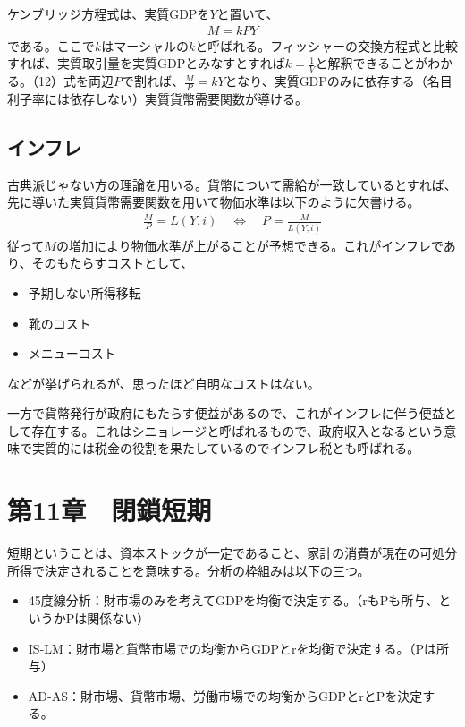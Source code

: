 \documentclass{jsarticle}
\begin{document}
ケンブリッジ方程式は、実質GDPを$Y$と置いて、
\begin{align}
	M = kPY
\end{align}
である。ここで$k$はマーシャルの$k$と呼ばれる。フィッシャーの交換方程式と比較すれば、実質取引量を実質GDPとみなすとすれば$k = \frac{1}{V}$と解釈できることがわかる。（12）式を両辺$P$で割れば、$\frac{M}{P} = kY$となり、実質GDPのみに依存する（名目利子率には依存しない）実質貨幣需要関数が導ける。

\subsection{インフレ}
古典派じゃない方の理論を用いる。貨幣について需給が一致しているとすれば、先に導いた実質貨幣需要関数を用いて物価水準は以下のように欠書ける。
\begin{align*}
	\frac{M}{P} = L(Y, i)\quad \Leftrightarrow\quad P = \frac{M}{L(Y, i)}
\end{align*}
従って$M$の増加により物価水準が上がることが予想できる。これがインフレであり、そのもたらすコストとして、
\begin{itemize}
\item 予期しない所得移転
\item 靴のコスト
\item メニューコスト
\end{itemize}
などが挙げられるが、思ったほど自明なコストはない。

一方で貨幣発行が政府にもたらす便益があるので、これがインフレに伴う便益として存在する。これはシニョレージと呼ばれるもので、政府収入となるという意味で実質的には税金の役割を果たしているのでインフレ税とも呼ばれる。

\section{第11章　閉鎖短期}
短期ということは、資本ストックが一定であること、家計の消費が現在の可処分所得で決定されることを意味する。分析の枠組みは以下の三つ。
\begin{itemize}
\item 45度線分析：財市場のみを考えてGDPを均衡で決定する。（rもPも所与、というかPは関係ない）
\item IS-LM：財市場と貨幣市場での均衡からGDPとrを均衡で決定する。（Pは所与）
\item AD-AS：財市場、貨幣市場、労働市場での均衡からGDPとrとPを決定する。
\end{itemize}
\end{document}
